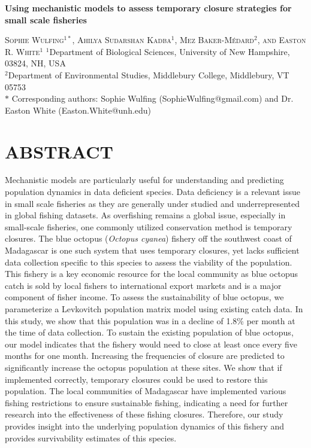 \documentclass[
]{article}
\author{}
\date{\vspace{-2.5em}}
\begin{document}
\begin{center}
    
\textbf{\Large Using mechanistic models to assess temporary closure strategies for small scale fisheries}
    
\textsc{Sophie Wulfing$^{1*}$, Ahilya Sudarshan Kadba$^{1}$, Mez Baker-Médard$^{2}$, and Easton R. White$^{1}$}
\vspace{3 mm}
\normalsize{\indent $^1$Department of Biological Sciences, University of New Hampshire, 03824, NH, USA \\ $^2$Department of Environmental Studies, Middlebury College, Middlebury, VT 05753\\}
$\text{*}$ Corresponding authors: Sophie Wulfing (SophieWulfing@gmail.com) and Dr. Easton White (Easton.White@unh.edu)
\end{center}

\linenumbers

\hypertarget{abstract}{%
\section{ABSTRACT}\label{abstract}}

Mechanistic models are particularly useful for understanding and predicting population dynamics in data deficient species. Data deficiency is a relevant issue in small scale fisheries as they are generally under studied and underrepresented in global fishing datasets. As overfishing remains a global issue, especially in small-scale fisheries, one commonly utilized conservation method is temporary closures. The blue octopus (\emph{Octopus cyanea}) fishery off the southwest coast of Madagascar is one such system that uses temporary closures, yet lacks sufficient data collection specific to this species to assess the viability of the population. This fishery is a key economic resource for the local community as blue octopus catch is sold by local fishers to international export markets and is a major component of fisher income. To assess the sustainability of blue octopus, we parameterize a Levkovitch population matrix model using existing catch data. In this study, we show that this population was in a decline of 1.8\% per month at the time of data collection. To sustain the existing population of blue octopus, our model indicates that the fishery would need to close at least once every five months for one month. Increasing the frequencies of closure are predicted to significantly increase the octopus population at these sites. We show that if implemented correctly, temporary closures could be used to restore this population. The local communities of Madagascar have implemented various fishing restrictions to ensure sustainable fishing, indicating a need for further research into the effectiveness of these fishing closures. Therefore, our study provides insight into the underlying population dynamics of this fishery and provides survivability estimates of this species.
\end{document}
